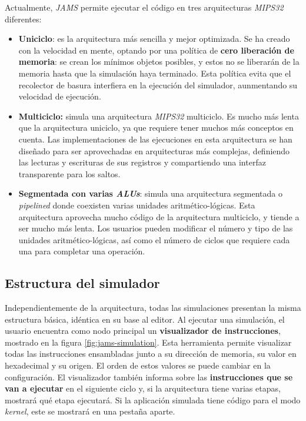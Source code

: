 Actualmente, \textit{JAMS} permite ejecutar el código
en tres arquitecturas \textit{MIPS32} diferentes:
\begin{itemize}
    \item \textbf{Uniciclo}: es la arquitectura más sencilla y
    mejor optimizada.
    Se ha creado con la velocidad en mente, optando por una
    política de \textbf{cero liberación de memoria}: se crean los mínimos
    objetos posibles, y estos no se liberarán de la memoria hasta que
    la simulación haya terminado.
    Esta política evita que el recolector de basura interfiera en la
    ejecución del simulador, aunmentando su velocidad de ejecución.
    \item \textbf{Multiciclo:} simula una arquitectura
    \textit{MIPS32} multiciclo.
    Es mucho más lenta que la arquitectura uniciclo, ya que requiere
    tener muchos más conceptos en cuenta.
    Las implementaciones de las ejecuciones en esta arquitectura
    se han diseñado para ser aprovechadas en arquitecturas más
    complejas, definiendo las lecturas y escrituras de sus
    registros y compartiendo una interfaz transparente para los saltos.
    \item \textbf{Segmentada con varias \textit{ALUs}}: simula
    una arquitectura segmentada o \textit{pipelined} donde coexisten varias
    unidades aritmético-lógicas.
    Esta arquitectura aprovecha mucho código de la arquitectura
    multiciclo, y tiende a ser mucho más lenta.
    Los usuarios pueden modificar el número y tipo de las unidades
    aritmético-lógicas, así como el número de ciclos que requiere
    cada una para completar una operación.
\end{itemize}

\subsection{Estructura del simulador}\label{subsec:estructura-del-simulador}

Independientemente de la arquitectura, todas las simulaciones presentan
la misma estructura básica, idéntica en su base al editor.
Al ejecutar una simulación, el usuario encuentra como nodo principal
un \textbf{visualizador de instrucciones}, mostrado en la figura \ref{fig:jams-simulation}.
Esta herramienta permite visualizar todas las instrucciones ensambladas
junto a su dirección de memoria, su valor en hexadecimal y
su origen.
El orden de estos valores se puede cambiar en la configuración.
El visualizador también informa sobre las \textbf{instrucciones que se van
a ejecutar} en el siguiente ciclo y, si la arquitectura tiene varias
etapas, mostrará qué etapa ejecutará.
Si la aplicación simulada tiene código para el modo \textit{kernel},
este se mostrará en una pestaña aparte.

